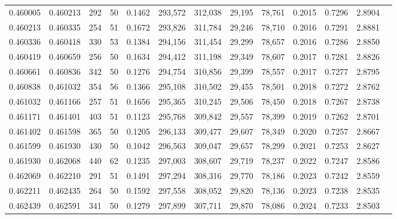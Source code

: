 \begin{tabular}{rrrrrrrrrrrrr}
0.460005 & 0.460213 &   292 &  50 &                                     0.1462 & 293,572 & 312,038 &  29,195 &  78,761 & 0.2015 & 0.7296 & 2.8904 \\
0.460213 & 0.460335 &   254 &  51 &                                     0.1672 & 293,826 & 311,784 &  29,246 &  78,710 & 0.2016 & 0.7291 & 2.8881 \\
0.460336 & 0.460418 &   330 &  53 &                                     0.1384 & 294,156 & 311,454 &  29,299 &  78,657 & 0.2016 & 0.7286 & 2.8850 \\
0.460419 & 0.460659 &   256 &  50 &                                     0.1634 & 294,412 & 311,198 &  29,349 &  78,607 & 0.2017 & 0.7281 & 2.8826 \\
0.460661 & 0.460836 &   342 &  50 &                                     0.1276 & 294,754 & 310,856 &  29,399 &  78,557 & 0.2017 & 0.7277 & 2.8795 \\
0.460838 & 0.461032 &   354 &  56 &                                     0.1366 & 295,108 & 310,502 &  29,455 &  78,501 & 0.2018 & 0.7272 & 2.8762 \\
0.461032 & 0.461166 &   257 &  51 &                                     0.1656 & 295,365 & 310,245 &  29,506 &  78,450 & 0.2018 & 0.7267 & 2.8738 \\
0.461171 & 0.461401 &   403 &  51 &                                     0.1123 & 295,768 & 309,842 &  29,557 &  78,399 & 0.2019 & 0.7262 & 2.8701 \\
0.461402 & 0.461598 &   365 &  50 &                                     0.1205 & 296,133 & 309,477 &  29,607 &  78,349 & 0.2020 & 0.7257 & 2.8667 \\
0.461599 & 0.461930 &   430 &  50 &                                     0.1042 & 296,563 & 309,047 &  29,657 &  78,299 & 0.2021 & 0.7253 & 2.8627 \\
0.461930 & 0.462068 &   440 &  62 &                                     0.1235 & 297,003 & 308,607 &  29,719 &  78,237 & 0.2022 & 0.7247 & 2.8586 \\
0.462069 & 0.462210 &   291 &  51 &                                     0.1491 & 297,294 & 308,316 &  29,770 &  78,186 & 0.2023 & 0.7242 & 2.8559 \\
0.462211 & 0.462435 &   264 &  50 &                                     0.1592 & 297,558 & 308,052 &  29,820 &  78,136 & 0.2023 & 0.7238 & 2.8535 \\
0.462439 & 0.462591 &   341 &  50 &                                     0.1279 & 297,899 & 307,711 &  29,870 &  78,086 & 0.2024 & 0.7233 & 2.8503 \\

\end{tabular}
